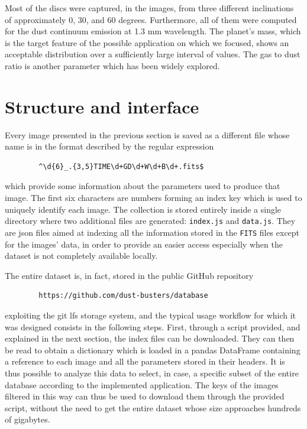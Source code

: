 \documentclass[a4paper,10pt]{report}
\begin{document}
Most of the discs were captured, in the images, from three different inclinations of approximately
0, 30, and 60 degrees. Furthermore, all of them were computed for the dust continuum emission 
at 1.3 mm wavelength.
The planet's mass, which is the target feature of the possible application on which we focused, shows an acceptable distribution over
a sufficiently large interval of values. The gas to dust ratio is another parameter which has been widely explored.

\section{Structure and interface}

Every image presented in the previous section is saved as a different file whose name is in the format 
described by the regular expression 
\begin{center}
    \begin{lstlisting}
        ^\d{6}_.{3,5}TIME\d+GD\d+W\d+B\d+.fits$
    \end{lstlisting}
\end{center}
which provide some information about the parameters used to produce that image. The first six 
characters are numbers forming an index key which is used to uniquely identify each image.
The collection is stored entirely inside a single directory where two additional files are generated: 
\lstinline{index.js} and \lstinline{data.js}. They are json files aimed at indexing all the information stored in the \lstinline{FITS} 
files except for the images' data, in order to provide an easier access especially when the dataset is not completely
available locally.

The entire dataset is, in fact, stored in the public GitHub repository 
\begin{center}
    \begin{lstlisting}
        https://github.com/dust-busters/database
    \end{lstlisting}
\end{center}
exploiting
the git lfs storage system, and the typical usage workflow for which it was designed 
consists in the following steps. First, through a script provided, and explained in the next section,
the index files can be downloaded. They can then be read to obtain a dictionary which is loaded in a pandas DataFrame containing
a reference to each image and all the parameters stored in their headers. 
It is thus possible to analyze this data to select, in case, a specific subset of the entire database
according to the implemented application.
The keys of the images filtered in this way can thus be used to download them through the provided script, without the need
to get the entire dataset whose size approaches hundreds of gigabytes.
\end{document}
